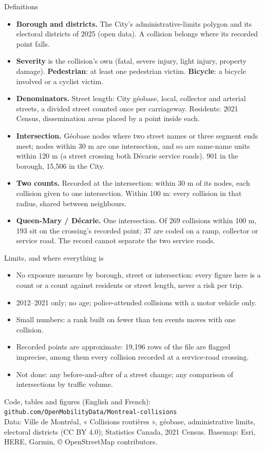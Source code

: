 \documentclass[aspectratio=169,10pt]{beamer}\usetheme{default}\usecolortheme{seahorse}\setbeamertemplate{navigation symbols}{}
\begin{document}
\begin{frame}{Definitions}
\small
\begin{itemize}\setlength\itemsep{4pt}
\item \textbf{Borough and districts.} The City's administrative-limits polygon and its electoral districts of 2025 (open data). A collision belongs where its recorded point falls.
\item \textbf{Severity} is the collision's own (fatal, severe injury, light injury, property damage). \textbf{Pedestrian}: at least one pedestrian victim. \textbf{Bicycle}: a bicycle involved or a cyclist victim.
\item \textbf{Denominators.} Street length: City géobase, local, collector and arterial streets, a divided street counted once per carriageway. Residents: 2021 Census, dissemination areas placed by a point inside each.
\item \textbf{Intersection.} Géobase nodes where two street names or three segment ends meet; nodes within 30 m are one intersection, and so are same-name units within 120 m (a street crossing both Décarie service roads). 901 in the borough, 15{,}506 in the City.
\item \textbf{Two counts.} Recorded at the intersection: within 30 m of its nodes, each collision given to one intersection. Within 100 m: every collision in that radius, shared between neighbours.
\item \textbf{Queen-Mary / Décarie.} One intersection. Of 269 collisions within 100 m, 193 sit on the crossing's recorded point; 37 are coded on a ramp, collector or service road. The record cannot separate the two service roads.
\end{itemize}
\end{frame}

\begin{frame}{Limits, and where everything is}
\small
\begin{itemize}\setlength\itemsep{5pt}
\item No exposure measure by borough, street or intersection: every figure here is a count or a count against residents or street length, never a risk per trip.
\item 2012--2021 only; no age; police-attended collisions with a motor vehicle only.
\item Small numbers: a rank built on fewer than ten events moves with one collision.
\item Recorded points are approximate: 19{,}196 rows of the file are flagged imprecise, among them every collision recorded at a service-road crossing.
\item Not done: any before-and-after of a street change; any comparison of intersections by traffic volume.
\end{itemize}
\medskip
Code, tables and figures (English and French): \texttt{github.com/OpenMobilityData/Montreal-collisions}\\
Data: Ville de Montréal, « Collisions routières », géobase, administrative limits, electoral districts (CC BY 4.0); Statistics Canada, 2021 Census. Basemap: Esri, HERE, Garmin, © OpenStreetMap contributors.
\end{frame}
\end{document}
